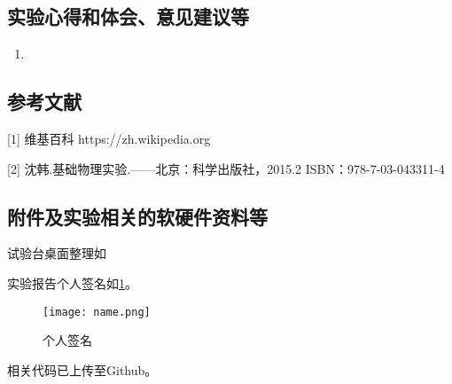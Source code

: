 \documentclass[dvipsnames, svgnames,a4paper,11pt]{article}
\begin{document}
	\subsection{实验心得和体会、意见建议等}
	\begin{enumerate}
		\item 
	\end{enumerate}
	
	\subsection{参考文献}
	[1] 维基百科 https://zh.wikipedia.org
	
	[2] 沈韩.基础物理实验.——北京：科学出版社，2015.2 ISBN：978-7-03-043311-4
	
	
	\subsection{附件及实验相关的软硬件资料等}
	试验台桌面整理如%
	
	实验报告个人签名如\cref{fig:name}。
	
	\begin{figure}[htbp]
		\centering
		\texttt{[image: name.png]}
		\caption{个人签名}
		\label{fig:name}
	\end{figure}
	
	
	相关代码已上传至Github。
	
	
	
\end{document}

